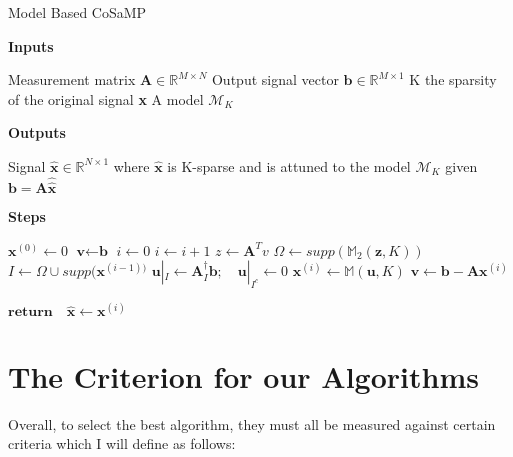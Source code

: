 \documentclass[titlepage,oneside, 12pt]{book}
\theoremstyle{break}
\begin{document}
\begin{algorithm}
  \caption{Model Based CoSaMP}
  \bigskip	
  \textbf{Inputs}%
  \begin{algorithmic}[1]
    \State Measurement matrix $\textbf{A} \in \mathbb{R}^{M \times N}$
    \State Output signal vector $\textbf{b} \in \mathbb{R}^{M \times 1}$
    \State K the sparsity of the original signal \textbf{x}
    \State A model $\mathcal{M}_K$
  \end{algorithmic}
  \bigskip  
  \textbf{Outputs}%
  \begin{algorithmic}[1]
    \State Signal $\hat{\textbf{x}} \in \mathbb{R}^{N \times 1}$ where $\hat{\textbf{x}}$ is K-sparse and is attuned to the model $\mathcal{M}_K$ given $\textbf{b} = \textbf{A}\hat{\hat{\textbf{x}}}$
  \end{algorithmic}
  \bigskip
  \textbf{Steps}%
  \begin{algorithmic}[1]
	\State $\textbf{x}^{(0)} \gets 0$
	\State $\textbf{v} \gets \textbf{b}$
	\State $i \gets 0$
    \State $i \gets i + 1$
	\State $z \gets \textbf{A}^{T}v$ 
    \State $\Omega \gets supp(\mathbb{M}_2 (\textbf{z},K))$
    \State $I \gets \Omega \cup supp(\textbf{x}^{(i - 1))}$
    \State $\textbf{u}|_{I} \gets \textbf{A}_{I}^{\dagger}\textbf{b}; \quad \textbf{u}|_{I^{c}} \gets 0$ 
    \State $\textbf{x}^{(i)} \gets \mathbb{M}(\textbf{u},K)$
    \State $ \textbf{v} \gets \textbf{b} - \textbf{A}\textbf{x}^{(i)}$
   \EndWhile
   
   \State $\textbf{return} \quad \hat{\textbf{x}} \gets \textbf{x}^{(i)}$
   \EndProcedure

  \end{algorithmic}
  
  \end{algorithm}



\newpage





\section{The Criterion for our Algorithms}\label{criterion}
Overall, to select the best algorithm, they must all be measured against certain criteria which I will define as follows:
\end{document}

